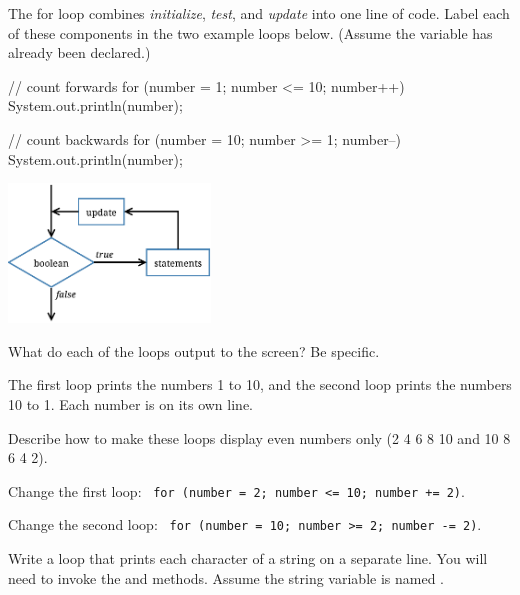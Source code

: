 
The for loop combines \emph{initialize}, \emph{test}, and \emph{update} into one line of code.
Label each of these components in the two example loops below.
(Assume the variable  has already been declared.)

\vspace{1ex}
\begin{minipage}{0.6\linewidth}
\begin{javalst}
    // count forwards
    for (number = 1; number <= 10; number++) {
        System.out.println(number);
    }

    // count backwards
    for (number = 10; number >= 1; number--) {
        System.out.println(number);
    }
\end{javalst}
\end{minipage}
\hfill
\begin{minipage}{0.38\linewidth}
\centering
\includegraphics[height=10em]{for.pdf}
\end{minipage}



\Q What do each of the  loops output to the screen? Be specific.

\begin{answer}
The first loop prints the numbers 1 to 10, and the second loop prints the numbers 10 to 1.
Each number is on its own line.
\end{answer}


\Q Describe how to make these loops display even numbers only (2 4 6 8 10 and 10 8 6 4 2).

\begin{answer}
Change the first loop: ~\texttt{for (number = 2; number <= 10; number += 2)}.

Change the second loop: ~\texttt{for (number = 10; number >= 2; number -= 2)}.
\end{answer}


\Q \label{forchar}
Write a  loop that prints each character of a string on a separate line.
You will need to invoke the  and  methods.
Assume the string variable is named .


